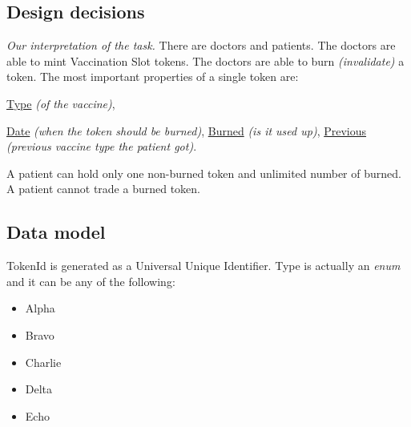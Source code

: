 \newcommand{\function}[4]{
  \textbf{#1}%
  (\emph{#2}):
  #3 \newline
  \emph{\color{teal} #4}
}

\newcommand{\gopkg}[2]{
  \href{https://pkg.go.dev/github.com/perryd01/vaccination-slot/chaincode#1}{#2}%
}

\newcommand{\testStruct}[3]{
  \subsubsection{#1}
  \paragraph*{Steps}
  \begin{enumerate}
    #2
  \end{enumerate}
  \textbf{Expected outcome:} #3
}

\newcommand{\vsType}[0]{\gopkg{\#VaccinationType}{Type}}
\newcommand{\vsDate}[0]{\gopkg{\#VaccinationDate}{Date}}


\subsection{Design decisions}
\emph{Our interpretation of the task.} There are doctors and patients. The doctors are able to mint Vaccination Slot tokens. The doctors are able to burn \emph{(invalidate)} a token. The most important properties of a single token are:%
\vsType \emph{(of the vaccine)},
\vsDate \emph{(when the token should be burned)},
\href{https://pkg.go.dev/github.com/perryd01/vaccination-slot/chaincode\#VaccinationDate}{Burned} \emph{(is it used up)},
\href{https://pkg.go.dev/github.com/perryd01/vaccination-slot/chaincode\#VaccinationSlotData}{Previous} \emph{(previous vaccine type the patient got)}.

A patient can hold only one non-burned token and unlimited number of burned. A patient cannot trade a burned token.


\subsection{Data model}
TokenId is generated as a Universal Unique Identifier. Type is actually an \emph{enum} and it can be any of the following:
\begin{itemize}
  \item Alpha
  \item Bravo
  \item Charlie
  \item Delta
  \item Echo
\end{itemize}

